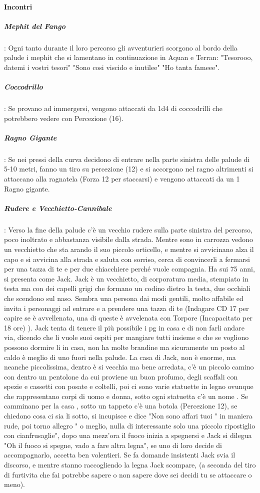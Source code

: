 \documentclass{article}
\begin{document}
\paragraph{Incontri}
\subparagraph{Mephit del Fango}: Ogni tanto durante il loro percorso gli avventurieri scorgono al bordo della palude i mephit che si lamentano in continuazione in Aquan e Terran:  "Tesorooo, datemi i vostri tesori" "Sono cosi viscido e inutilee" "Ho tanta fameee".
\subparagraph{Coccodrillo}: Se provano ad immergersi, vengono attaccati da 1d4 di coccodrilli che potrebbero vedere con Percezione (16).
\subparagraph{Ragno Gigante}: Se nei pressi della curva decidono di entrare nella parte sinistra delle palude di 5-10 metri, fanno un tiro su percezione (12) e si accorgono nel ragno altrimenti si attaccano alla ragnatela (Forza 12 per staccarsi) e vengono attaccati da un 1 Ragno gigante. 
\subparagraph{Rudere e Vecchietto-Cannibale}: Verso la fine della palude c'è un vecchio rudere sulla parte sinistra del percorso, poco inoltrato e abbastanza visibile dalla strada. Mentre sono in carrozza vedono un vecchietto che sta arando il suo piccolo orticello, e mentre si avvicinano alza il capo e si avvicina alla strada e saluta con sorriso, 
cerca di convincerli a fermarsi per una tazza di te e per due chiacchiere perché vuole compagnia. 
 Ha sui 75 anni, si presenta come Jack. Jack è un vecchietto, di corporatura media, stempiato in testa ma con dei capelli grigi che formano un codino dietro la testa, 
 due occhiali che scendono sul naso. Sembra una persona dai modi gentili, molto affabile ed invita i personaggi ad entrare e a prendere una tazza di te
  (Indagare CD 17 per capire se è avvellenata, una di queste è avvelenata con Torpore (Incapacitato per 18 ore) ). Jack tenta di tenere il più possibile i pg in casa e di non farli andare via,
   dicendo che li vuole suoi ospiti per mangiare tutti insieme e che se vogliono possono dormire li in casa, non ha molte brandine ma sicuramente un posto al caldo è meglio di uno fuori nella palude.
La casa di Jack, non è enorme, ma neanche piccolissima, dentro è si vecchia ma bene arredata, 
c'è un piccolo camino con dentro un pentolone da cui proviene un buon profumo, degli scaffali con spezie e cassetti con posate e coltelli,
 poi ci sono varie statuette in legno ovunque che rappresentano corpi di uomo e donna, sotto ogni statuetta c'è un nome . 
 Se camminano per la casa , sotto un tappeto c'è una botola (Percezione 12), se chiedono cosa ci sia li sotto, si incupisce e dice "Non sono affari tuoi " in maniera rude, poi torno allegro " o meglio, nulla di interessante solo una piccolo ripostiglio con cianfrusaglie", dopo una mezz'ora il fuoco inizia a spegnersi e Jack si dilegua "Oh il fuoco si spegne, vado a fare altra legna", se uno di loro decide di accompagnarlo, accetta ben volentieri. Se fa domande insistenti Jack svia il discorso, e mentre stanno raccogliendo la legna Jack scompare, (a seconda del tiro di furtivita che fai potrebbe sapere o non sapere dove sei decidi tu se attaccare o meno). 
\end{document}
